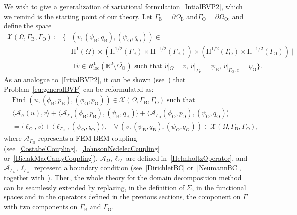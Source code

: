 \documentclass[a4paper,11pt]{article}
\newcommand{\RR}{\mathbb{R}}
\newcommand{\mH}{\mathrm{H}}
\begin{document}
We wish to give a generalization of variational formulation~\eqref{IntialBVP2}, which we remind is the starting point of our theory. 
Let ${\Gamma}_{\text{B}} = \partial\Omega_{\text{B}}$ and${\Gamma}_{\text{O}} = \partial\Omega_{\text{O}}$, and define the space
\begin{equation*}
\begin{split}
  \mathscr{X}(\Omega, {\Gamma}_{\text{B}}, {\Gamma}_{\text{O}}) \coloneq 
  \{ & ( v, (\psi_{\text{B}}, q_{\text{B}}), (\psi_{\text{O}}, q_{\text{O}}) ) \in \\
  & \mH^{1}(\Omega) \times (\mH^{1/2}(\Gamma_{\text{B}})\times \mH^{-1/2}(\Gamma_{\text{B}})) \times (\mH^{1/2}(\Gamma_{\text{O}})\times \mH^{-1/2}(\Gamma_{\text{O}})) \mid \\
  &\exists\, \tilde{v} \in H^1_{\text{loc}}(\RR^d\setminus \overline{\Omega_{\text{O}}}) \text{ such that } \tilde{v} |_{\Omega}=v, \,\tilde{v} |_{\Gamma_{\text{B}}} = \psi_{\text{B}}, \,\tilde{v} |_{\Gamma_{\text{O}}, c} = \psi_{\text{O}} 
  \}.
\end{split}
\end{equation*}
As an analogue to~\eqref{IntialBVP2}, it can be shown (see~\cite{noteCRAS}) that Problem~\eqref{eq:generalBVP} can be reformulated as: 
\begin{equation}\label{eq:varfgeneralBVP}
  \begin{aligned}
    & \text{Find}\; ( u, (\phi_{\text{B}}, p_{\text{B}}), (\phi_{\text{O}}, p_{\text{O}}) ) \in \mathscr{X}(\Omega, {\Gamma}_{\text{B}}, {\Gamma}_{\text{O}}) \; \text{such that}\\
    & \langle \mathcal{A}_{\Omega}(u),v \rangle 
    + \langle \mathcal{A}_{\Gamma_{\text{B}}}(\phi_{\text{B}},p_{\text{B}}), (\psi_{\text{B}},q_{\text{B}}) \rangle
    + \langle \mathcal{A}_{\Gamma_{\text{O}}}(\phi_{\text{O}},p_{\text{O}}), (\psi_{\text{O}},q_{\text{O}}) \rangle \\
    & = \langle \ell_{\Omega}, v\rangle 
      + \langle \ell_{\Gamma_{\text{O}}}, (\psi_{\text{O}},q_{\text{O}}) \rangle, 
    \quad \forall \, ( v, (\psi_{\text{B}}, q_{\text{B}}), (\psi_{\text{O}}, q_{\text{O}}) ) \in \mathscr{X}(\Omega, {\Gamma}_{\text{B}}, {\Gamma}_{\text{O}}), 
  \end{aligned}
\end{equation}
where $\mathcal{A}_{\Gamma_{\text{B}}}$ represents a FEM-BEM coupling (see~\eqref{CostabelCoupling},~\eqref{JohnsonNedelecCoupling} or~\eqref{BielakMacCamyCoupling}), $\mathcal{A}_{\Omega}, \ell_{\Omega}$ are defined in~\eqref{HelmholtzOperator}, and $\mathcal{A}_{\Gamma_{\text{O}}}, \ell_{\Gamma_{\text{O}}}$ represent a boundary condition (see~\eqref{DirichletBC} or~\eqref{NeumannBC}, together with~\cite[Examples 3.1--3.4]{MR4665035}). 
Then, the whole theory for the domain decomposition method can be seamlessly extended by replacing, in the definition of \(\Sigma\), in the functional spaces and in the operators defined in the previous sections, the component on $\Gamma$ with two components on ${\Gamma}_{\text{B}}$ and ${\Gamma}_{\text{O}}$. 
\end{document}
